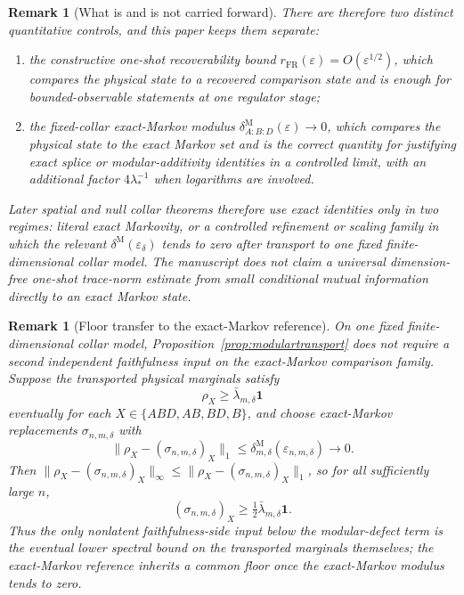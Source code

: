 \documentclass[11pt]{article}
\newtheorem{remark}[theorem]{Remark}
\begin{document}
\begin{remark}[What is and is not carried forward]
There are therefore two distinct quantitative controls, and this paper keeps them separate:
\begin{enumerate}[leftmargin=2em]
\item the constructive one-shot recoverability bound \(r_{\mathrm{FR}}(\varepsilon)=O(\varepsilon^{1/2})\), which compares the physical state to a recovered comparison state and is enough for bounded-observable statements at one regulator stage;
\item the fixed-collar exact-Markov modulus \(\delta^{\mathrm M}_{A:B:D}(\varepsilon)\to 0\), which compares the physical state to the exact Markov set and is the correct quantity for justifying exact splice or modular-additivity identities in a controlled limit, with an additional factor \(4\lambda_\ast^{-1}\) when logarithms are involved.
\end{enumerate}
Later spatial and null collar theorems therefore use exact identities only in two regimes: literal exact Markovity, or a controlled refinement or scaling family in which the relevant \(\delta^{\mathrm M}(\varepsilon_\delta)\) tends to zero after transport to one fixed finite-dimensional collar model. The manuscript does \emph{not} claim a universal dimension-free one-shot trace-norm estimate from small conditional mutual information directly to an exact Markov state.
\end{remark}

\begin{remark}[Floor transfer to the exact-Markov reference]
On one fixed finite-dimensional collar model, Proposition~\ref{prop:modulartransport} does not require a second independent faithfulness input on the exact-Markov comparison family. Suppose the transported physical marginals satisfy
\[
\rho_X\ge \bar\lambda_{m,\delta}\mathbf 1
\]
eventually for each \(X\in\{ABD,AB,BD,B\}\), and choose exact-Markov replacements \(\sigma_{n,m,\delta}\) with
\[
\|\rho_X-(\sigma_{n,m,\delta})_X\|_1
\le
\delta^{\mathrm M}_{m,\delta}(\varepsilon_{n,m,\delta})
\longrightarrow 0.
\]
Then \(\|\rho_X-(\sigma_{n,m,\delta})_X\|_\infty\le \|\rho_X-(\sigma_{n,m,\delta})_X\|_1\), so for all sufficiently large \(n\),
\[
(\sigma_{n,m,\delta})_X
\ge
\tfrac12\bar\lambda_{m,\delta}\mathbf 1.
\]
Thus the only nonlatent faithfulness-side input below the modular-defect term is the eventual lower spectral bound on the transported marginals themselves; the exact-Markov reference inherits a common floor once the exact-Markov modulus tends to zero.
\end{remark}
\end{document}
